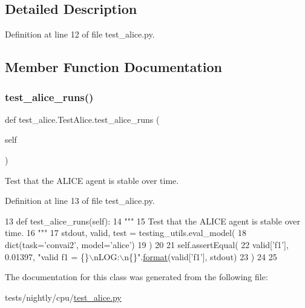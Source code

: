 \subsection{Detailed Description}


Definition at line 12 of file test\+\_\+alice.\+py.



\subsection{Member Function Documentation}
\mbox{\label{classtest__alice_1_1TestAlice_a3a80164e5af443ea6f7027e2e653c616}} 
\subsubsection{\texorpdfstring{test\+\_\+alice\+\_\+runs()}{test\_alice\_runs()}}
{\footnotesize\ttfamily def test\+\_\+alice.\+Test\+Alice.\+test\+\_\+alice\+\_\+runs (\begin{DoxyParamCaption}\item[{}]{self }\end{DoxyParamCaption})}

\begin{DoxyVerb}Test that the ALICE agent is stable over time.
\end{DoxyVerb}
 

Definition at line 13 of file test\+\_\+alice.\+py.


\begin{DoxyCode}
13     \textcolor{keyword}{def }test\_alice\_runs(self):
14         \textcolor{stringliteral}{"""}
15 \textcolor{stringliteral}{        Test that the ALICE agent is stable over time.}
16 \textcolor{stringliteral}{        """}
17         stdout, valid, test = testing\_utils.eval\_model(
18             dict(task=\textcolor{stringliteral}{'convai2'}, model=\textcolor{stringliteral}{'alice'})
19         )
20 
21         self.assertEqual(
22             valid[\textcolor{stringliteral}{'f1'}], 0.01397, \textcolor{stringliteral}{"valid f1 = \{\}\(\backslash\)nLOG:\(\backslash\)n\{\}"}.\hyperlink{namespaceparlai_1_1chat__service_1_1services_1_1messenger_1_1shared__utils_a32e2e2022b824fbaf80c747160b52a76}{format}(valid[\textcolor{stringliteral}{'f1'}], stdout)
23         )
24 
25 
\end{DoxyCode}


The documentation for this class was generated from the following file\+:\begin{DoxyCompactItemize}
\item 
tests/nightly/cpu/\hyperlink{test__alice_8py}{test\+\_\+alice.\+py}\end{DoxyCompactItemize}
